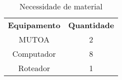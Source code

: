 \begin{table}[]
	\centering
	\label{my-label}
	\begin{tabular}{|c|c|}
	\textbf{Equipamento} & \textbf{Quantidade} \\
	MUTOA                & 2                   \\
	Computador           & 8                   \\
	Roteador             & 1                  
	\end{tabular}
	\caption{Necessidade de material}
\end{table}